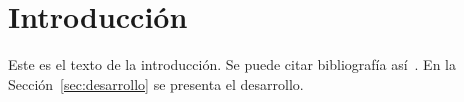 \section{Introducción}
\label{sec:introduccion}

Este es el texto de la introducción.
Se puede citar bibliografía así~\cite{knuth1984}.
En la Sección~\ref{sec:desarrollo} se presenta el desarrollo.
